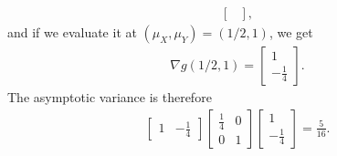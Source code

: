 \documentclass[a4paper]{article}
\begin{document}
\begin{Solution}
\begin{itemize}
\begin{align*}
\begin{bmatrix}
				\end{bmatrix},
			\end{align*}
			and if we evaluate it at $(\mu_X, \mu_Y) = (1/2, 1)$, we get 
			\begin{align*}
				\nabla g(1/2, 1) = \begin{bmatrix}
					1 \\ -\frac{1}{4}
				\end{bmatrix}.
			\end{align*}
			The asymptotic variance is therefore 
			\begin{align*}
				\begin{bmatrix}
					1 & -\frac{1}{4}
				\end{bmatrix}
				\begin{bmatrix}
					\frac{1}{4} & 0 \\
					0 & 1
				\end{bmatrix}
				\begin{bmatrix}
					1 \\ -\frac{1}{4}
				\end{bmatrix}
				= \frac{5}{16}.
			\end{align*}
	\end{itemize}
\end{Solution}
\end{document}
